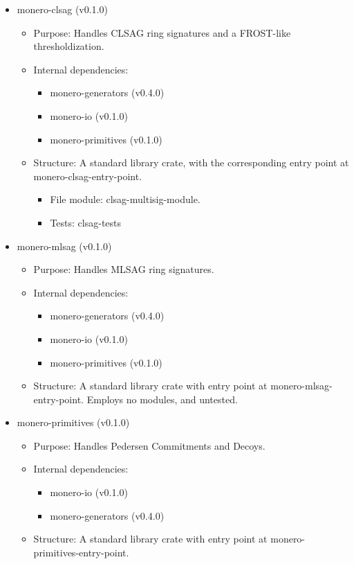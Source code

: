 \documentclass[12pt,a4paper]{article}
\begin{document}
\begin{itemize}
   
   \item \gls{monero-clsag (v0.1.0)}
   \begin{itemize}
   \item Purpose: Handles CLSAG ring signatures and a FROST-like thresholdization.
   \item Internal dependencies:
   \begin{itemize}
   \item \gls{monero-generators (v0.4.0)}
   \item \gls{monero-io (v0.1.0)}
   \item \gls{monero-primitives (v0.1.0)}
   \end{itemize}
   \item Structure: A standard library crate, with the corresponding entry point at \gls{monero-clsag-entry-point}.
   \begin{itemize}
   \item File module: \gls{clsag-multisig-module}.
   \item Tests: \gls{clsag-tests}
   \end{itemize}
   \end{itemize}
   
   \item \gls{monero-mlsag (v0.1.0)}
   \begin{itemize}
   \item Purpose: Handles MLSAG ring signatures.
   \item Internal dependencies:
   \begin{itemize}
   \item \gls{monero-generators (v0.4.0)}
   \item \gls{monero-io (v0.1.0)}
   \item \gls{monero-primitives (v0.1.0)}
   \end{itemize}
   \item Structure: A standard library crate with entry point at \gls{monero-mlsag-entry-point}. Employs no modules, and untested.
   \end{itemize}


   
 \item \gls{monero-primitives (v0.1.0)}
   \begin{itemize}
   \item Purpose: Handles Pedersen Commitments and Decoys.
   \item Internal dependencies:
   \begin{itemize}
   \item  \gls{monero-io (v0.1.0)} 
   \item \gls{monero-generators (v0.4.0)}
   \end{itemize}
   \item Structure: A standard library crate with entry point at \gls{monero-primitives-entry-point}. 
   \begin{itemize}
   

\end{itemize}
\end{itemize}
\end{itemize}
\end{document}
